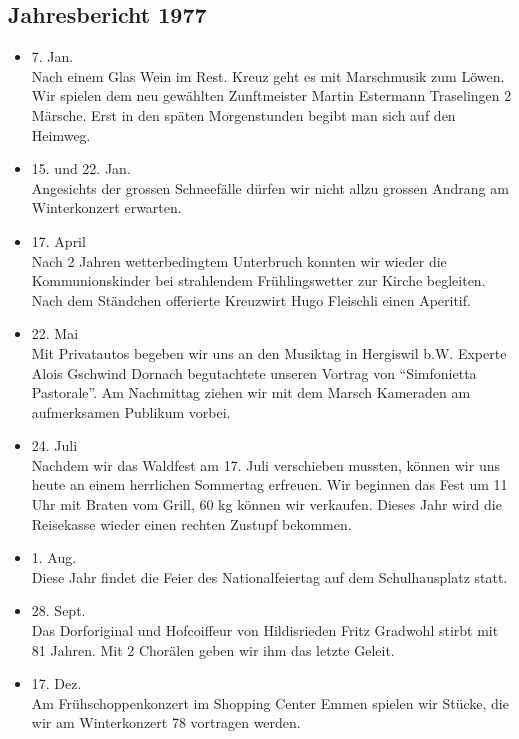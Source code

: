 \subsection{Jahresbericht 1977}

\begin{history}


    \begin{itemize}

        \item[]7. Jan.\\
        Nach einem Glas Wein im Rest. Kreuz geht es mit Marschmusik zum Löwen.
        Wir spielen dem neu gewählten Zunftmeister Martin Estermann Traselingen
        2 Märsche. Erst in den späten Morgenstunden begibt man sich auf den
        Heimweg.

        \item[]15. und 22. Jan.\\
        Angesichts der grossen Schneefälle dürfen wir nicht allzu grossen
        Andrang am Winterkonzert erwarten.

        \item[]17. April\\
        Nach 2 Jahren wetterbedingtem Unterbruch konnten wir wieder die
        Kommunionskinder bei strahlendem Frühlingswetter zur Kirche begleiten.
        Nach dem Ständchen offerierte Kreuzwirt Hugo Fleischli einen Aperitif.

        \item[]22. Mai\\
        Mit Privatautos begeben wir uns an den Musiktag in Hergiswil b.W.
        Experte Alois Gschwind Dornach begutachtete unseren Vortrag von
        \enquote{Simfonietta Pastorale}. Am Nachmittag ziehen wir mit dem Marsch
        Kameraden am aufmerksamen Publikum vorbei.

        \item[]24. Juli\\
        Nachdem wir das Waldfest am 17. Juli verschieben mussten, können wir uns
        heute an einem herrlichen Sommertag erfreuen. Wir beginnen das Fest um
        11 Uhr mit Braten vom Grill, 60 kg können wir verkaufen. Dieses Jahr
        wird die Reisekasse wieder einen rechten Zustupf bekommen.

        \item[]1. Aug.\\
        Diese Jahr findet die Feier des Nationalfeiertag auf dem Schulhausplatz
        statt.

        \item[]28. Sept.\\
        Das Dorforiginal und Hofcoiffeur von Hildisrieden Fritz Gradwohl stirbt
        mit 81 Jahren. Mit 2 Chorälen geben wir ihm das letzte Geleit.

        \item[]17. Dez.\\
        Am Frühschoppenkonzert im Shopping Center Emmen spielen wir Stücke, die
        wir am Winterkonzert 78 vortragen werden.

    \end{itemize}

\end{history}
